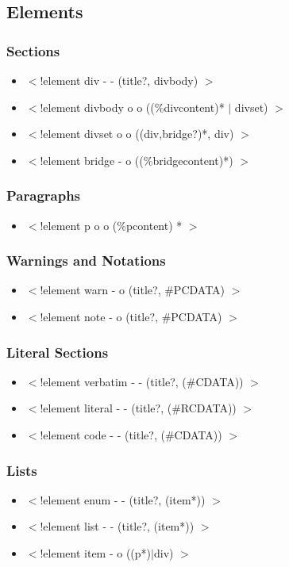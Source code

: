 \subsection{Elements}

\subsubsection{Sections}
\begin{itemize}
\item
$<$!element div - - (title?, divbody) $>$
\item
$<$!element divbody o o ((\%divcontent)* $|$ divset) $>$
\item
$<$!element divset o o ((div,bridge?)*, div) $>$
\item
$<$!element bridge - o ((\%bridgecontent)*) $>$
\end{itemize}
\subsubsection{Paragraphs}
\begin{itemize}
\item
$<$!element p o o (\%pcontent) * $>$

\end{itemize}
\subsubsection{Warnings and Notations}
\begin{itemize}
\item
$<$!element warn - o (title?, \#PCDATA) $>$
\item
$<$!element note - o (title?, \#PCDATA) $>$
\end{itemize}
\subsubsection{Literal Sections}
\begin{itemize}
\item
$<$!element verbatim - - (title?, (\#CDATA)) $>$
\item
$<$!element literal - - (title?, (\#RCDATA)) $>$
\item
$<$!element code - - (title?, (\#CDATA)) $>$
\end{itemize}
\subsubsection{Lists}
\begin{itemize}
\item
$<$!element enum - - (title?, (item*)) $>$
\item
$<$!element list - - (title?, (item*)) $>$
\item
$<$!element item - o ((p*)$|$div) $>$
\end{itemize}
